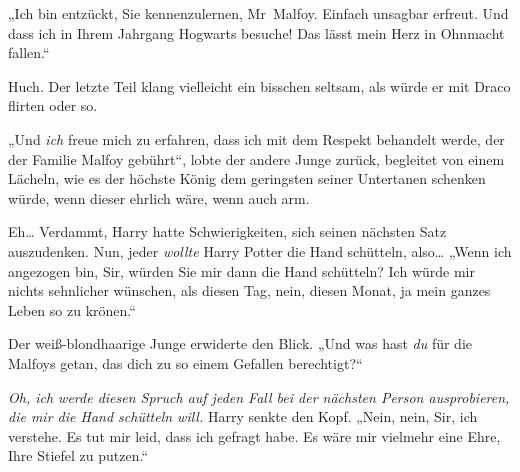 „Ich bin entzückt, Sie kennenzulernen, Mr~Malfoy. Einfach unsagbar erfreut. Und dass ich in Ihrem Jahrgang Hogwarts besuche! Das lässt mein Herz in Ohnmacht fallen.“

Huch. Der letzte Teil klang vielleicht ein bisschen seltsam, als würde er mit Draco flirten oder so.

„Und \emph{ich} freue mich zu erfahren, dass ich mit dem Respekt behandelt werde, der der Familie Malfoy gebührt“, lobte der andere Junge zurück, begleitet von einem Lächeln, wie es der höchste König dem geringsten seiner Untertanen schenken würde, wenn dieser ehrlich wäre, wenn auch arm.

Eh… Verdammt, Harry hatte Schwierigkeiten, sich seinen nächsten Satz auszudenken. Nun, jeder \emph{wollte} Harry Potter die Hand schütteln, also… „Wenn ich angezogen bin, Sir, würden Sie mir dann die Hand schütteln? Ich würde mir nichts sehnlicher wünschen, als diesen Tag, nein, diesen Monat, ja mein ganzes Leben so zu krönen.“

Der weiß-blondhaarige Junge erwiderte den Blick. „Und was hast \emph{du} für die Malfoys getan, das dich zu so einem Gefallen berechtigt?“

\emph{Oh, ich werde diesen Spruch auf jeden Fall bei der nächsten Person ausprobieren, die mir die Hand schütteln will.} Harry senkte den Kopf. „Nein, nein, Sir, ich verstehe. Es tut mir leid, dass ich gefragt habe. Es wäre mir vielmehr eine Ehre, Ihre Stiefel zu putzen.“

